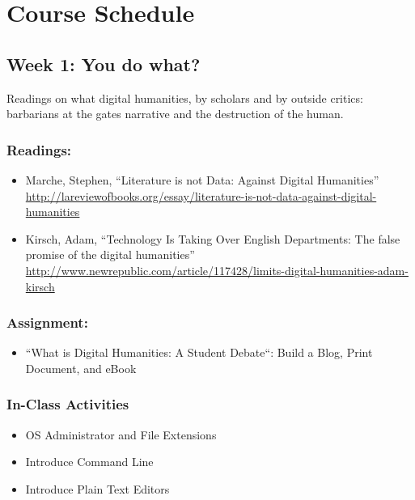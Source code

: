 \documentclass[]{article}
\begin{document}
\section{Course Schedule}\label{course-schedule}

\subsection{Week 1: You do what?}\label{week-1-you-do-what}

Readings on what digital humanities, by scholars and by outside critics:
barbarians at the gates narrative and the destruction of the human.

\subsubsection{Readings:}\label{readings}

\begin{itemize}
\itemsep1pt\parskip0pt
\item
  Marche, Stephen, ``Literature is not Data: Against Digital
  Humanities''
  \url{http://lareviewofbooks.org/essay/literature-is-not-data-against-digital-humanities}
\item
  Kirsch, Adam, ``Technology Is Taking Over English Departments: The
  false promise of the digital humanities''
  \url{http://www.newrepublic.com/article/117428/limits-digital-humanities-adam-kirsch}
\end{itemize}

\subsubsection{Assignment:}\label{assignment}

\begin{itemize}
\itemsep1pt\parskip0pt
\item
  ``What is Digital Humanities: A Student Debate``: Build a Blog, Print
  Document, and eBook
\end{itemize}

\subsubsection{In-Class Activities}\label{in-class-activities}

\begin{itemize}
\itemsep1pt\parskip0pt
\item
  OS Administrator and File Extensions
\item
  Introduce Command Line
\item
  Introduce Plain Text Editors
\end{itemize}
\end{document}

